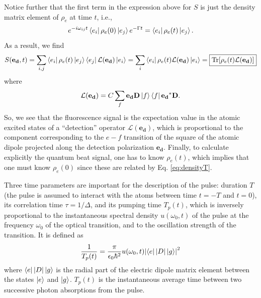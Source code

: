 \documentclass[11pt]{article}
\newcommand{\lag}{\mathcal{L}}
\newcommand{\f}[2]{\frac{#1}{#2}}
\begin{document}
\begin{appendices}
\begin{equation*}
\end{equation*}
Notice further that the first term in the expression above for $S$ is just the density matrix element of $\rho_e$ at time $t$, i.e., 
\begin{equation}\label{eq:densityT}
e^{-i\omega_{ij}t} \bra{e_i}\rho_e(0)\ket{e_j} e^{-\Gamma t} = \bra{e_i}\rho_e(t)\ket{e_j}.
\end{equation}
As a result, we find 
\begin{equation}\label{eq:SignalTrace}
S(\mathbf{e_d} ,t) = \sum_{i,j} \bra{e_i}\rho_e(t)\ket{e_j} \bra{e_j}\lag(\mathbf{e_d}) \ket{e_i} = \sum_i \bra{e_i} \rho_e(t)\lag(\mathbf{e_d}) \ket{e_i} = \boxed{\Tr[\rho_e(t)\lag(\mathbf{e_d})]}
\end{equation}
where 
\begin{equation*}
\lag(\mathbf{e_d}) = C\sum_f \mathbf{e_d} \mathbf{D}\ket{f}\bra{f}\mathbf{e_d}^* \mathbf{D}.
\end{equation*}
So, we see that the fluorescence signal is the expectation value in the atomic excited states of a ``detection'' operator $\lag(\mathbf{e_d})$, which is proportional to the component corresponding to the $e-f$ transition of the square of the atomic dipole projected along the detection polarization $\mathbf{e_d}$. Finally, to calculate explicitly the quantum beat signal, one has to know $\rho_e(t)$, which implies that one must know $\rho_e(0)$ since these are related by Eq. \ref{eq:densityT}.


Three time parameters are important for the description of the pulse: duration $T$ (the pulse is assumed to interact with the atoms between time $t=-T$ and $t=0$), its correlation time $\tau = 1/\Delta$, and its pumping time $T_p(t)$, which is inversely proportional to the instantaneous spectral density $u(\omega_0,t)$ of the pulse at the frequency $\omega_0$ of the optical transition, and to the oscillation strength of the transition. It is defined as
\begin{equation*}
\f{1}{T_p(t)} = \f{\pi}{\epsilon_0 \hbar^2} u(\omega_0,t) \abs{ \bra{e} \abs{D} \ket{g}}^2
\end{equation*}
where $\bra{e} \abs{D} \ket{g}$ is the radial part of the electric dipole matrix element between the states $\ket{e}$ and $\ket{g}$. $T_p(t)$ is the instantaneous average time between two successive photon absorptions from the pulse. 


\end{appendices}
\end{document}

